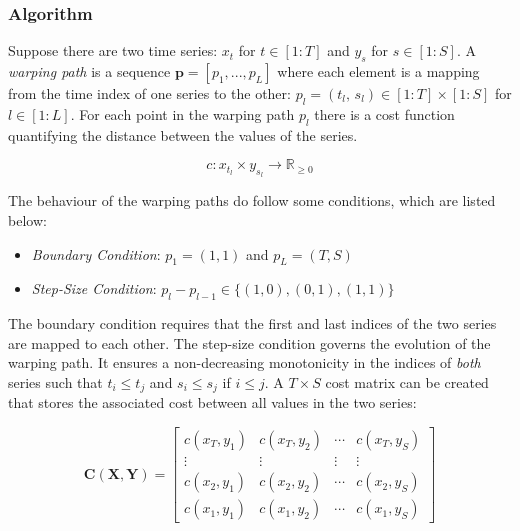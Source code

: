 \documentclass[12pt]{article}
\begin{document}
\subsubsection{Algorithm} \label{sec:DTW_Algorithm}

Suppose there are two time series: $x_{t}$ for $t \in [1:T]$ and $y_{s}$ for $s \in [1:S]$. A \emph{warping path} is a sequence $\boldsymbol{p} = [p_{1},..., p_{L}]$ where each element is a mapping from the time index of one series to the other: $p_{l} = (t_{l}, \, s_{l}) \in [1:T] \times [1:S]$ for $l \in [1:L]$. For each point in the warping path $p_{l}$ there is a cost function quantifying the distance between the values of the series.

\begin{equation}
    c: x_{t_{l}} \times y_{s_{l}} \rightarrow \mathbb{R}_{\ge 0}
\end{equation}

The behaviour of the warping paths do follow some conditions, which are listed below:

\begin{itemize}
    \item \emph{Boundary Condition}: $p_{1} = (1, 1)$ and $p_{L} = (T, S)$ 
    \item \emph{Step-Size Condition}: $p_{l} - p_{l - 1} \in \{ (1, 0), (0, 1), (1, 1) \} $
\end{itemize}

The boundary condition requires that the first and last indices of the two series are mapped to each other. The step-size condition governs the evolution of the warping path. It ensures a non-decreasing monotonicity in the indices of \emph{both} series such that $t_{i} \le t_{j}$ and $s_{i} \le s_{j}$ if $i \le j$. A $T \times S$ cost matrix can be created that stores the associated cost between all values in the two series:

\begin{equation}
    \mathbf{C}(\boldsymbol{X}, \boldsymbol{Y}) = \left[ 
        \begin{array}{cccc}
            c(x_{T}, y_{1}) & c(x_{T}, y_{2}) & \cdots & c(x_{T}, y_{S}) \\ 
            \vdots          & \vdots          & \vdots & \vdots          \\
            c(x_{2}, y_{1}) & c(x_{2}, y_{2}) & \cdots & c(x_{2}, y_{S}) \\ 
            c(x_{1}, y_{1}) & c(x_{1}, y_{2}) & \cdots & c(x_{1}, y_{S})
    \end{array}\right]
\end{equation}
\end{document}
